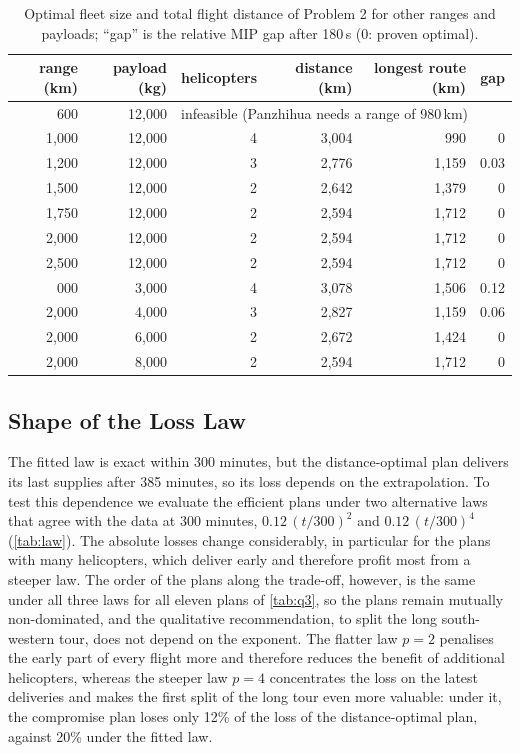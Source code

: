 \documentclass[11pt,a4paper]{article}
\theoremstyle{definition}
\begin{document}
\begin{table}[ht]
\centering
\caption{Optimal fleet size and total flight distance of Problem 2 for other ranges and payloads; ``gap'' is the relative MIP gap after 180\,s (0: proven optimal).}\label{tab:range}
\small
\begin{tabular}{rrrrrr}
\toprule
range (km) & payload (kg) & helicopters & distance (km) & longest route (km) & gap \\
\midrule
600 & 12{,}000 & \multicolumn{4}{l}{infeasible (Panzhihua needs a range of 980\,km)} \\
1{,}000 & 12{,}000 & 4 & 3{,}004 & 990 & 0 \\
1{,}200 & 12{,}000 & 3 & 2{,}776 & 1{,}159 & 0.03 \\
1{,}500 & 12{,}000 & 2 & 2{,}642 & 1{,}379 & 0 \\
1{,}750 & 12{,}000 & 2 & 2{,}594 & 1{,}712 & 0 \\
2{,}000 & 12{,}000 & 2 & 2{,}594 & 1{,}712 & 0 \\
2{,}500 & 12{,}000 & 2 & 2{,}594 & 1{,}712 & 0 \\
\addlinespace
2{,}000 & 3{,}000 & 4 & 3{,}078 & 1{,}506 & 0.12 \\
2{,}000 & 4{,}000 & 3 & 2{,}827 & 1{,}159 & 0.06 \\
2{,}000 & 6{,}000 & 2 & 2{,}672 & 1{,}424 & 0 \\
2{,}000 & 8{,}000 & 2 & 2{,}594 & 1{,}712 & 0 \\
\bottomrule
\end{tabular}
\end{table}

\subsection{Shape of the Loss Law}\label{sec:sens-law}
The fitted law is exact within 300 minutes, but the distance-optimal plan delivers its last supplies after 385 minutes, so its loss depends on the extrapolation.
To test this dependence we evaluate the efficient plans under two alternative laws that agree with the data at 300 minutes, $0.12\,(t/300)^2$ and $0.12\,(t/300)^4$ (\cref{tab:law}).
The absolute losses change considerably, in particular for the plans with many helicopters, which deliver early and therefore profit most from a steeper law.
The order of the plans along the trade-off, however, is the same under all three laws for all eleven plans of \cref{tab:q3}, so the plans remain mutually non-dominated, and the qualitative recommendation, to split the long south-western tour, does not depend on the exponent.
The flatter law $p=2$ penalises the early part of every flight more and therefore reduces the benefit of additional helicopters, whereas the steeper law $p=4$ concentrates the loss on the latest deliveries and makes the first split of the long tour even more valuable: under it, the compromise plan loses only 12\% of the loss of the distance-optimal plan, against 20\% under the fitted law.
\end{document}
